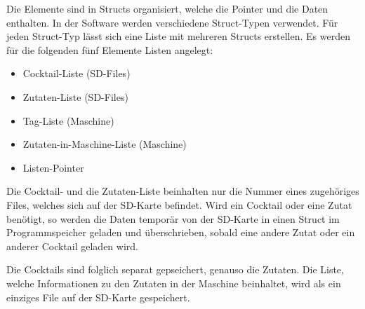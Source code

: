 Die Elemente sind in Structs organisiert, welche die Pointer und die Daten enthalten. In der Software werden verschiedene Struct-Typen verwendet. Für jeden Struct-Typ lässt sich eine Liste mit mehreren Structs erstellen. Es werden für die folgenden fünf Elemente Listen angelegt:

\begin{itemize}
\item Cocktail-Liste (SD-Files)
\item Zutaten-Liste (SD-Files)
\item Tag-Liste (Maschine)
\item Zutaten-in-Maschine-Liste (Maschine)
\item Listen-Pointer
\end{itemize}

Die Cocktail- und die Zutaten-Liste beinhalten nur die Nummer eines zugehöriges Files, welches sich auf der SD-Karte befindet. Wird ein Cocktail oder eine Zutat benötigt, so werden die Daten temporär von der SD-Karte in einen Struct im Programmspeicher geladen und überschrieben, sobald eine andere Zutat oder ein anderer Cocktail geladen wird.

Die Cocktails sind folglich separat gepseichert, genauso die Zutaten. Die Liste, welche Informationen zu den Zutaten in der Maschine beinhaltet, wird als ein einziges File auf der SD-Karte gespeichert.
